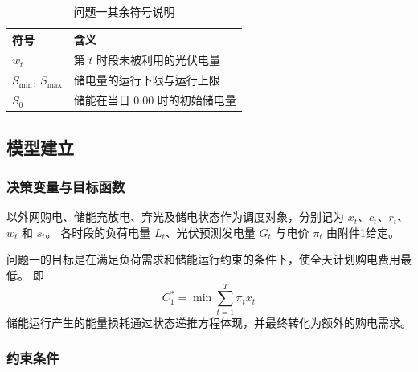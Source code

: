 \begin{table}[htbp]
    \centering
    \caption{问题一其余符号说明}
    \label{tab:q1_symbols}
    \renewcommand{\arraystretch}{1.35}
    \begin{tabularx}{0.92\textwidth}{
        >{\centering\arraybackslash}p{}
        >{\centering\arraybackslash}X}
        \toprule
        符号 & 含义 \\
        \midrule
        $w_t$ & 第 $t$ 时段未被利用的光伏电量 \\
        $S_{\min},\ S_{\max}$ & 储电量的运行下限与运行上限 \\
        $S_0$ & 储能在当日 0:00 时的初始储电量 \\
        \bottomrule
    \end{tabularx}
\end{table}
\subsection{模型建立}

\subsubsection{决策变量与目标函数}
以外网购电、储能充放电、弃光及储电状态作为调度对象，分别记为 \(x_t\)、\(c_t\)、\(r_t\)、\(w_t\) 和 \(s_t\)。
各时段的负荷电量 \(L_t\)、光伏预测发电量 \(G_t\) 与电价 \(\pi_t\) 由附件1给定。

问题一的目标是在满足负荷需求和储能运行约束的条件下，使全天计划购电费用最低。
即
\begin{equation}
    C_1^{*}
    =
    \min \sum_{t=1}^{T}\pi_t x_t
    \label{eq:q1_stage1}
\end{equation}
储能运行产生的能量损耗通过状态递推方程体现，并最终转化为额外的购电需求。

\subsubsection{约束条件}


